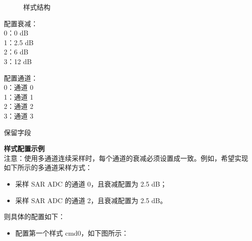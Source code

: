 \documentclass[main\_\_CN.tex]{subfiles}
\begin{document}
\begin{figure}[H]
\centering
{}%
%
%
\end{figure}
\vspace{-2em}
\begin{figure}[H]
    \centering
    \caption{样式结构}
    \label{fig:adc-pattern-table-entry}
\end{figure}
\vspace{-2em}
\begin{regdesc}\begin{reglist}
\item [atten] 配置衰减：\\
0：0 dB\\
1：2.5 dB\\
2：6 dB\\
3：12 dB
\item [ch\_sel] 配置通道：\\
0：通道 0 \\
1：通道 1 \\
2：通道 2 \\
3：通道 3 \\

\item [(reserved)] 保留字段
\end{reglist}\end{regdesc}

\textbf{样式配置示例} \\
注意：使用多通道连续采样时，每个通道的衰减必须设置成一致。例如，希望实现如下所示的多通道采样方式：
\begin{itemize}
    \item 采样 SAR ADC 的通道 0，且衰减配置为 2.5 dB；
    \item 采样 SAR ADC 的通道 2，且衰减配置为 2.5 dB。
\end{itemize}

则具体的配置如下：

\begin{itemize}
    \item 配置第一个样式 cmd0，如下图所示：

\centering
{}%
%
%
\reglabel{}\regnewline%
\begin{regdesc}\end{regdesc}
\end{itemize}
\end{document}
